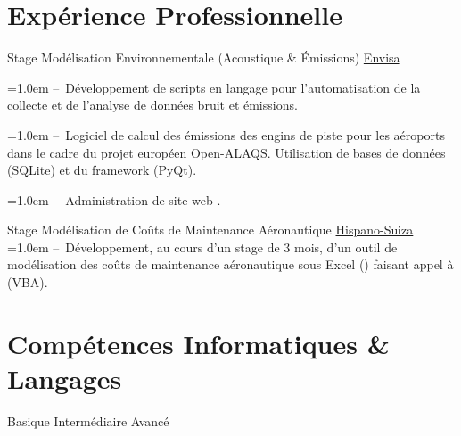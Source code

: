 \documentclass[10pt, a4paper]{article}
\begin{document}
\section{Expérience Professionnelle}
\begin{experiences}
	{Stage Modélisation Environnementale (Acoustique \& \'Emissions)}
	{\hfill}
	{\href{http://www.env-isa.com}{Envisa}}
	{\hangindent=1.0em --~Développement de scripts en langage \python pour l'automatisation de la collecte et de l'analyse de données bruit et émissions.

	\hangindent=1.0em --~Logiciel \python de calcul des émissions des engins de piste pour les aéroports dans le cadre du projet européen Open-ALAQS. Utilisation de bases de données \sql (SQLite) et du framework \qt (PyQt).
	
	\hangindent=1.0em --~Administration de site web \wordpress.}
	{Stage Modélisation de Coûts de Maintenance Aéronautique}
	{\hfill}
	{\href{http://www.safran-transmission-systems.com}{Hispano-Suiza}}
	{\hangindent=1.0em --~Développement, au cours d'un stage de 3 mois, d'un outil de modélisation des coûts de maintenance aéronautique sous Excel (\office) faisant appel à \visb (VBA).}
\end{experiences}
\section{Compétences Informatiques \& Langages}
\vspace{-0.5em}
\begin{skillslisting}
	\skills{\threeskill}{\python}
	\skills{\twoskill}{\bootstrap}
	\skills{\threeskill}{\html}
	\skills{\threeskill}{\sass}
	\skills{\threeskill}{\js}
	\skills{\threeskill}{\jquery}
	\skills{\twoskill}{\react}
	\skills{\oneskill}{\angular}
	\skills{\threeskill}{\sql}
	\skills{\twoskill}{\git}
	\skills{\twoskill}{\patterns}
	\skills{\oneskill}{\visb}
	\skills{\twoskill}{\LaTeX}
	\skills{\twoskill}{\matlab}
\end{skillslisting}
\vspace{-0.5em}
\begin{footnotesize}
	\oneskill Basique \hfill
	\twoskill Intermédiaire \hfill
	\threeskill Avancé
\end{footnotesize}
\end{document}
